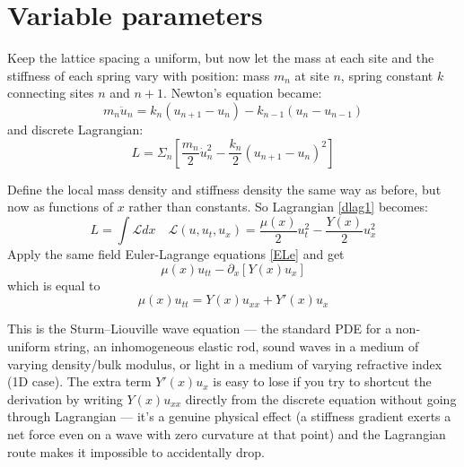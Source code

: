 \section{Variable parameters}

Keep the lattice spacing 
a uniform, but now let the mass at each site and the stiffness of each spring vary with position: mass $m_n$ at site $n$,
spring constant $k$ connecting sites $n$ and $n+1$.
Newton's equation became:
\begin{equation}
   \label {neq1}
    m_n \ddot u_n=k_n(u_{n+1}-u_n)-k_{n-1}(u_n-u_{n-1})
\end{equation}
and discrete Lagrangian:
\begin{equation}
   \label {dlag1}
    L=\Sigma_n \left[\frac{m_n}{2}{\dot u}_n^2-\frac{k_n}{2}(u_{n+1}-u_n)^2 \right]
\end{equation}

Define the local mass density and stiffness density the same way as before, but now as functions of 
$x$ rather than constants. So Lagrangian \eqref{dlag1} becomes:
\begin{equation}
   \label {flag}
    L=\int \mathcal{L} dx \quad \mathcal{L}(u,u_t,u_x)=\frac{\mu(x)}{2}u_t^2-\frac{Y(x)}{2}u_x^2
\end{equation}
Apply the same field Euler-Lagrange equations \eqref{ELe} and
get 
\begin{equation}
   \label {we1}
    \mu(x) u_{tt}-\partial_x \left[Y(x) u_x \right]
\end{equation} 
which is equal to
\begin{equation}
   \label {we2}
    \mu(x) u_{tt}=Y(x) u_{xx} + Y'(x)u_x
\end{equation} 

This is the Sturm–Liouville wave equation — the standard PDE for a non-uniform string, an inhomogeneous elastic rod, sound waves in a medium of varying density/bulk modulus, or light in a medium of varying refractive index (1D case). The extra term 
$Y'(x)u_x$ is easy to lose if you try to shortcut the derivation by writing $Y(x)u_{xx}$  directly from the discrete equation without going through Lagrangian
 --- it's a genuine physical effect (a stiffness gradient exerts a net force even on a wave with zero curvature at that point) and the Lagrangian route makes it impossible to accidentally drop.


